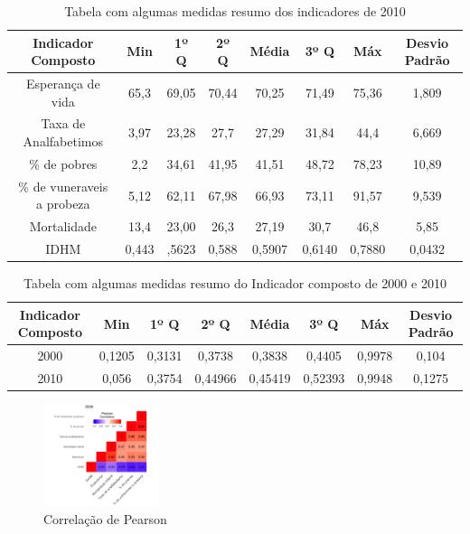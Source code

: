 \documentclass[11pt,a4paper]{article}
\begin{document}
\begin{table}[h!]
  \begin{center}
      \caption{Tabela com algumas medidas resumo dos indicadores de 2010}
    \begin{tabular}{c|c|c|c|c|c|c|c}
    \hline
      \textbf{Indicador Composto} & \textbf{Min} & \textbf{1º Q} & \textbf{2º Q} & \textbf{Média} & \textbf{3º Q} & \textbf{Máx}  & \textbf{Desvio Padrão} \\
      \hline
      Esperança de vida & 65,3 & 69,05 & 70,44 & 70,25 & 71,49 & 75,36 & 1,809 \\
      Taxa de Analfabetimos & 3,97 & 23,28 & 27,7 & 27,29 & 31,84 & 44,4 & 6,669\\
      \% de pobres & 2,2 & 34,61 & 41,95 & 41,51 & 48,72 & 78,23 & 10,89  \\ 
      \% de vuneraveis a probeza & 5,12 & 62,11 & 67,98 & 66,93 & 73,11 & 91,57 & 9,539 \\ 
      Mortalidade & 13,4 & 23,00 & 26,3 & 27,19 & 30,7 & 46,8 & 5,85\\ 
      IDHM & 0,443 & ,5623 & 0,588 & 0,5907 & 0,6140 & 0,7880 & 0,0432\\ 
      \hline
    \end{tabular}
     \label{table:2}
  \end{center}
\end{table}
\vspace{-1cm}
\begin{table}[h!]
  \begin{center}
      \caption{Tabela com algumas medidas resumo do Indicador composto de 2000 e 2010}
    \begin{tabular}{c|c|c|c|c|c|c|c}
    \hline
      \textbf{Indicador Composto} & \textbf{Min} & \textbf{1º Q} & \textbf{2º Q} & \textbf{Média} & \textbf{3º Q} & \textbf{Máx}  & \textbf{Desvio Padrão} \\
      \hline
	  2000 & 0,1205 & 0,3131 & 0,3738 & 0,3838 & 0,4405 & 0,9978 & 0,104\\
	  2010 & 0,056 & 0,3754 & 0,44966 & 0,45419 & 0,52393 & 0,9948 & 0,1275\\
      \hline
    \end{tabular}
     \label{table:3}
  \end{center}
\end{table}

\begin{figure}[H]
\centering
\includegraphics[width=0.3\textwidth]{2000.png}
\caption{Correlação de Pearson}
\label{Per}
\end{figure}
\end{document}
